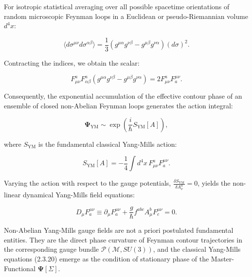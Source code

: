 For isotropic statistical averaging over all possible spacetime orientations of random microscopic Feynman loops in a Euclidean or pseudo-Riemannian volume $d^4x$:

\begin{equation}\label{eq:2.3.16}\tag{2.3.16}
\langle d\sigma^{\mu\nu} d\sigma^{\alpha\beta} \rangle = \frac{1}{3} \left( g^{\mu\alpha} g^{\nu\beta} - g^{\mu\beta} g^{\nu\alpha} \right) (d\sigma)^2.
\end{equation}

Contracting the indices, we obtain the scalar:

\begin{equation}\label{eq:2.3.17}\tag{2.3.17}
F_{\mu\nu}^a F_{\alpha\beta}^a \left( g^{\mu\alpha} g^{\nu\beta} - g^{\mu\beta} g^{\nu\alpha} \right) = 2 F_{\mu\nu}^a F^{\mu\nu}_a.
\end{equation}

Consequently, the exponential accumulation of the effective contour phase of an ensemble of closed non-Abelian Feynman loops generates the action integral:

\begin{equation}\label{eq:2.3.18}\tag{2.3.18}
\mathbf{\Psi}_{\text{YM}} \sim \exp\left( \frac{i}{\hbar} S_{\text{YM}}[A] \right),
\end{equation}

where $S_{\text{YM}}$ is the fundamental classical Yang-Mills action:

\begin{equation}\label{eq:2.3.19}\tag{2.3.19}
S_{\text{YM}}[A] = -\frac{1}{4} \int d^4x \, F_{\mu\nu}^a F^{\mu\nu}_a.
\end{equation}

Varying the action with respect to the gauge potentials, $\frac{\delta S_{\text{YM}}}{\delta A_\nu^a} = 0$, yields the non-linear dynamical Yang-Mills field equations:

\begin{equation}\label{eq:2.3.20}\tag{2.3.20}
D_\mu F^{\mu\nu}_a \equiv \partial_\mu F^{\mu\nu}_a + \frac{g}{\hbar} f^{abc} A_\mu^b F^{\mu\nu}_c = 0.
\end{equation}

\begin{theorem}\label{thm:2.3.1}
Non-Abelian Yang-Mills gauge fields are not a priori postulated fundamental entities. They are the direct phase curvature of Feynman contour trajectories in the corresponding gauge bundle $\mathcal{P}(\mathcal{M}, SU(3))$, and the classical Yang-Mills equations (2.3.20) emerge as the condition of stationary phase of the Master-Functional $\mathbf{\Psi}[\Sigma]$.
\end{theorem}

